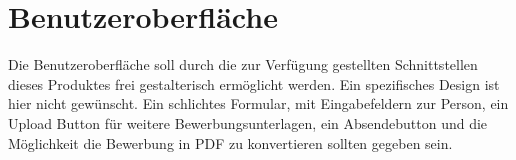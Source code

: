\section{Benutzeroberfläche}
    Die Benutzeroberfläche soll durch die zur Verfügung gestellten Schnittstellen dieses Produktes frei gestalterisch ermöglicht werden. Ein spezifisches Design ist hier nicht gewünscht. Ein schlichtes Formular, mit Eingabefeldern zur Person, ein Upload Button für weitere Bewerbungsunterlagen, ein Absendebutton und die Möglichkeit die Bewerbung in PDF zu konvertieren sollten gegeben sein.
